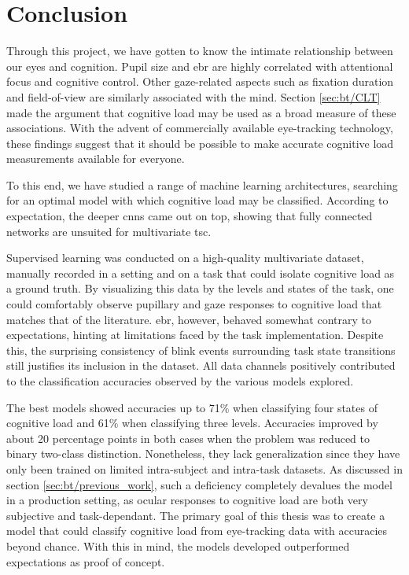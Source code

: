 \chapter{Conclusion}

Through this project, we have gotten to know the intimate relationship between our eyes and cognition. 
Pupil size and \acrlong{ebr} are highly correlated with attentional focus and cognitive control. Other gaze-related aspects such as fixation duration and field-of-view are similarly associated with the mind. 
Section \ref{sec:bt/CLT} made the argument that cognitive load may be used as a broad measure of these associations. With the advent of commercially available eye-tracking technology, these findings suggest that it should be possible to make accurate cognitive load measurements available for everyone.

To this end, we have studied a range of machine learning architectures, searching for an optimal model with which cognitive load may be classified. According to expectation, the deeper \acrlong{cnn}s came out on top, showing that fully connected networks are unsuited for multivariate \acrlong{tsc}. 

Supervised learning was conducted on a high-quality multivariate dataset, manually recorded in a setting and on a task that could isolate cognitive load as a ground truth. By visualizing this data by the levels and states of the task, one could comfortably observe pupillary and gaze responses to cognitive load that matches that of the literature. \acrshort{ebr}, however, behaved somewhat contrary to expectations, hinting at limitations faced by the task implementation. Despite this, the surprising consistency of blink events surrounding task state transitions still justifies its inclusion in the dataset. All data channels positively contributed to the classification accuracies observed by the various models explored.

The best models showed accuracies up to 71\% when classifying four states of cognitive load and 61\% when classifying three levels. Accuracies improved by about 20 percentage points in both cases when the problem was reduced to binary two-class distinction. Nonetheless, they lack generalization since they have only been trained on limited intra-subject and intra-task datasets. As discussed in section \ref{sec:bt/previous_work}, such a deficiency completely devalues the model in a production setting, as ocular responses to cognitive load are both very subjective and task-dependant. 
The primary goal of this thesis was to create a model that could classify cognitive load from eye-tracking data with accuracies beyond chance. With this in mind, the models developed outperformed expectations as proof of concept.

